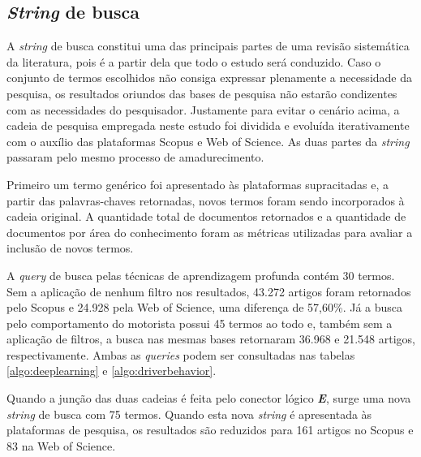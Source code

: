 \documentclass[10pt,journal,compsoc]{IEEEtran}
\begin{document}
\subsection{\textit{String} de busca}
\label{sec:protocolo:string}
A \textit{string} de busca constitui uma das principais partes de uma
revisão sistemática da literatura, pois é a partir dela que todo o
estudo será conduzido. Caso o conjunto de termos escolhidos não
consiga expressar plenamente a necessidade da pesquisa, os resultados
oriundos das bases de pesquisa não estarão condizentes com as necessidades do
pesquisador. Justamente para evitar o cenário acima, a cadeia de pesquisa
empregada neste estudo foi dividida e evoluída iterativamente com o
auxílio das plataformas Scopus e Web of Science. As duas partes da
\textit{string} passaram pelo mesmo processo de amadurecimento.

Primeiro um termo genérico foi apresentado às plataformas
supracitadas e, a partir das palavras-chaves retornadas, novos termos
foram sendo incorporados à cadeia original. A quantidade total de documentos
retornados e a quantidade de documentos por área do conhecimento foram
as métricas utilizadas para avaliar a inclusão de novos
termos.

A \textit{query} de busca pelas técnicas de aprendizagem profunda
contém 30 termos. Sem a aplicação de nenhum filtro nos resultados, 43.272 artigos foram
retornados pelo Scopus e 24.928 pela Web of Science, uma diferença de
57,60\%. Já a busca pelo comportamento do motorista possui 45
termos ao todo e, também sem a aplicação de filtros, a busca nas
mesmas bases retornaram 36.968 e 21.548 artigos, respectivamente. Ambas as \textit{queries} podem ser
consultadas nas tabelas \ref{algo:deeplearning} e
\ref{algo:driverbehavior}.

Quando a junção das duas cadeias é feita pelo conector lógico
\emph{\textbf{E}}, surge uma nova \textit{string} de busca com 75 termos. Quando esta nova
\textit{string} é apresentada às plataformas de pesquisa, os
resultados são reduzidos para 161 artigos no Scopus e 83 na Web of
Science.
\end{document}
